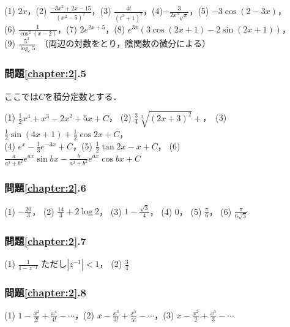 \noindent (1) $2x$，(2) $\displaystyle \frac{-3x^2+2x-15}{(x^2-5)^2}$，(3) $\displaystyle \frac{4t}{(t^2+1)^2}$，(4)$\displaystyle -\frac{3}{2x^3\sqrt{x}}$，(5) $-3\cos (2-3x)$，\\
(6) $\displaystyle \frac{1}{\cos^2(x-2)}$，(7) $2e^{2x+5}$，(8) $e^{3x}(3\cos (2x+1)-2\sin (2x+1))$，\\
(9) $\displaystyle \frac{5^x}{\log_e 5}$　（両辺の対数をとり，陰関数の微分による）

\subsubsection*{問題\ref{chapter:2}.5}

ここでは$C$を積分定数とする．

\noindent (1) $\displaystyle \frac{1}{2}x^4+x^3-2x^2+5x+C$， (2) $\displaystyle \frac{3}{4}\sqrt[3]{(2x+3)^2}+$，　(3) $\displaystyle \frac{1}{2} \sin (4x+1) +\frac{1}{2} \cos 2x + C$，
\\
(4) $\displaystyle e^x - \frac{1}{3}e^{-3x}+C$，(5) $\displaystyle \frac{1}{2} \tan 2x -x+C$，
(6) $\displaystyle \frac{a}{a^2+b^2}e^{ax}\sin bx -\frac{b}{a^2+b^2}e^{ax}\cos bx +C$

\subsubsection*{問題\ref{chapter:2}.6}

\noindent (1) $\displaystyle -\frac{20}{3}$， (2) $\displaystyle \frac{14}{3}+2\log 2$，
(3) $\displaystyle 1-\frac{\sqrt{3}}{4}$， (4) 0， 
(5) $\displaystyle \frac{\pi}{6}$， (6) $\displaystyle \frac{\pi}{6\sqrt{3}}$

\subsubsection*{問題\ref{chapter:2}.7}

\noindent (1) $\displaystyle \frac{1}{1-z^{-1}}$ ただし$|z^{-1}|<1$， (2) $\displaystyle \frac{3}{4}$ 

\subsubsection*{問題\ref{chapter:2}.8}

\noindent (1) $\displaystyle 1-\frac{x^2}{2!}+\frac{x^4}{4!}-\cdots$，(2) $\displaystyle x-\frac{x^3}{3!}+\frac{x^5}{5!}-\cdots$，(3) $\displaystyle x-\frac{x^2}{2}+\frac{x^3}{3}-\cdots$

